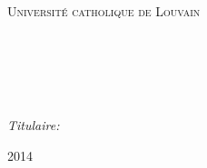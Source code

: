 
\begin{titlepage}

\begin{center}

\begin{minipage}[t]{0.48\textwidth}
  \begin{flushleft}
    \begin{spacing}{1.5}
      \textsc{\LARGE Université catholique de Louvain}
    \end{spacing}
  \end{flushleft}
\end{minipage}

\textsc{\Large \reportsubject}\\[0.5cm]
\HRule \\[0.4cm]
{\huge \bfseries \reporttitle}\\[0.4cm]
\HRule \\[1.5cm]

\begin{minipage}[t]{0.3\textwidth}
  \begin{flushleft} \large
    \emph{Titulaire:}\\
    \reportauthor
  \end{flushleft}
\end{minipage}

\vfill

{\large 2014}

\end{center}

\end{titlepage}
